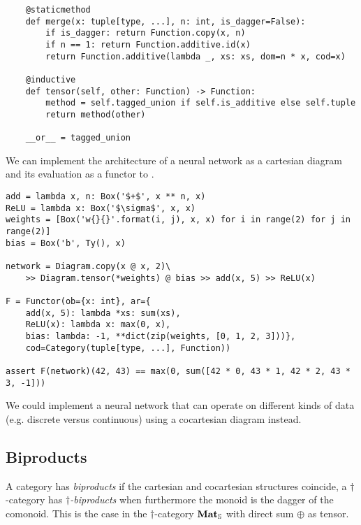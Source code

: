 \begin{python}
\begin{verbatim}
    @staticmethod
    def merge(x: tuple[type, ...], n: int, is_dagger=False):
        if is_dagger: return Function.copy(x, n)
        if n == 1: return Function.additive.id(x)
        return Function.additive(lambda _, xs: xs, dom=n * x, cod=x)

    @inductive
    def tensor(self, other: Function) -> Function:
        method = self.tagged_union if self.is_additive else self.tuple
        return method(other)

    __or__ = tagged_union
\end{verbatim}
\end{python}

\begin{example}
We can implement the architecture of a neural network as a cartesian diagram and its evaluation as a functor to .

\begin{verbatim}
add = lambda x, n: Box('$+$', x ** n, x)
ReLU = lambda x: Box('$\sigma$', x, x)
weights = [Box('w{}{}'.format(i, j), x, x) for i in range(2) for j in range(2)]
bias = Box('b', Ty(), x)

network = Diagram.copy(x @ x, 2)\
    >> Diagram.tensor(*weights) @ bias >> add(x, 5) >> ReLU(x)

F = Functor(ob={x: int}, ar={
    add(x, 5): lambda *xs: sum(xs),
    ReLU(x): lambda x: max(0, x),
    bias: lambda: -1, **dict(zip(weights, [0, 1, 2, 3]))},
    cod=Category(tuple[type, ...], Function))

assert F(network)(42, 43) == max(0, sum([42 * 0, 43 * 1, 42 * 2, 43 * 3, -1]))
\end{verbatim}

We could implement a neural network that can operate on different kinds of data (e.g. discrete versus continuous) using a cocartesian diagram instead.
\end{example}

\subsection{Biproducts}\label{subsection:biproducts}

A category has \emph{biproducts} if the cartesian and cocartesian structures coincide,
a $\dagger$-category has \emph{$\dagger$-biproducts} when furthermore the monoid is the dagger of the comonoid.
This is the case in the $\dagger$-category $\mathbf{Mat}_\S$ with direct sum $\oplus$ as tensor.

